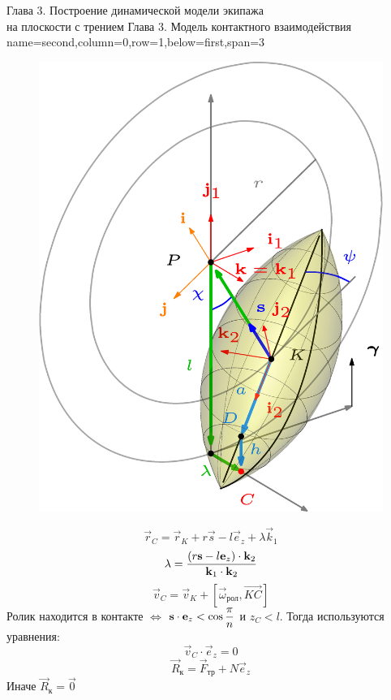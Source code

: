 \begin{myposter}{
    Глава 3. Построение динамической модели экипажа \\ на плоскости с трением
}
    \headerbox
    {Глава 3. Модель контактного взаимодействия}
    {name=second,column=0,row=1,below=first,span=3}
    {
        {\huge\bf
            \vspace{10pt}
                \begin{figure}[H]
                    \centering
                    \includegraphics[width=\textwidth]{content/pic/asypng/pic_mecanum.png}
                    \label{ContactScheme}
                \end{figure}
            \endminipage
            \quad
                $$ \vec{r}_C = \vec{r}_K + r\vec{s} - l\vec{e}_z + \lambda\vec{k}_1 $$
                $$ \lambda = \displaystyle\frac{\displaystyle \left(r\boldsymbol{\mathbf{s}} - l\boldsymbol{\mathbf{e}}_z\right)\cdot\boldsymbol{\mathbf{k}}_2}{\displaystyle  \boldsymbol{\mathbf{k}}_1\cdot\boldsymbol{\mathbf{k}}_2} $$
                $$ \vec{v}_C = \vec{v}_K + [ \vec{\omega}_{\text{рол}}, \overrightarrow{KC} ] $$
                Ролик находится в контакте $\iff$ $\boldsymbol{\mathbf{s}} \cdot \boldsymbol{\mathbf{e}}_z < \cos\displaystyle\frac{\displaystyle \pi}{\displaystyle n} $ и $ z_C < l $. Тогда используются уравнения:
                $$ \vec{v}_C \cdot \vec{e}_z = 0 $$
                $$ \vec{R}_{\text{к}} = \vec{F}_{\text{тр}} + N\vec{e}_z $$
                Иначе $ \vec{R}_{\text{к}} = \vec{0} $
            \endminipage
            \vspace{10pt}
        }
    }
    
\end{myposter}
